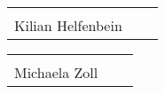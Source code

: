 
\vspace*{1 cm}

\noindent \begin{tabular}{p{7cm}p{.5cm}l}
	\dotfill \\ 
	Kilian Helfenbein
\end{tabular}%
\vspace*{1 cm}
\begin{tabular}{p{7cm}p{.5cm}l}
	\dotfill \\ 
	Michaela Zoll
\end{tabular}

\newpage